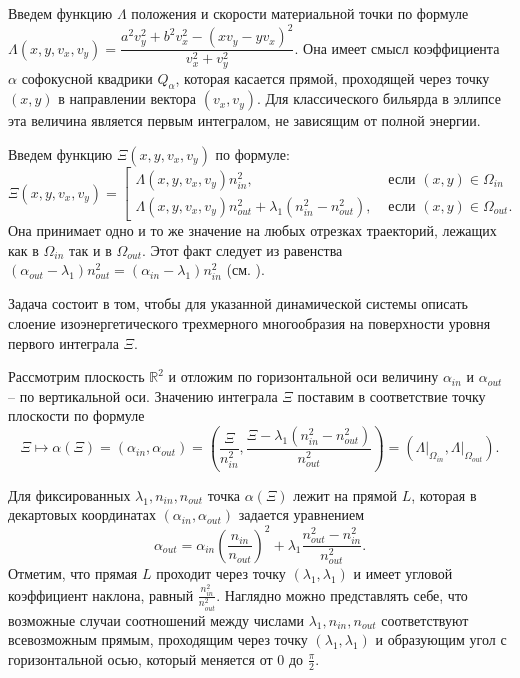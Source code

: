 Введем функцию $\Lambda$ положения и скорости материальной точки по формуле 
$\Lambda(x, y, v_x, v_y) =  \dfrac{a^2 v_y^2 + b^2v_x^2 - (x v_y-y v_x)^2}{v_x^2 + v_y^2}$. 
Она имеет смысл коэффициента $\alpha$  софокусной квадрики $Q_\alpha$, которая касается прямой, проходящей через точку $(x,y)$ в направлении вектора $(v_x, v_y)$.
Для классического бильярда в эллипсе эта величина является первым интегралом, не зависящим от полной энергии.

Введем функцию  $\Xi(x, y, v_x, v_y)$ по формуле: 
\begin{equation*}
\Xi(x, y, v_x, v_y) = \left[
\begin{array}{ll}
    \Lambda(x, y, v_x, v_y) n_{in}^2, &  \text{ если } (x,y) \in \Omega_{in} \\
    \Lambda(x, y, v_x, v_y) n_{out}^2 + \lambda_1 (n_{in}^2-n_{out}^2), & \text{ если } (x,y) \in \Omega_{out}    .
\end{array}
\right.
\end{equation*}
Она принимает одно и то же значение на любых отрезках траекторий, лежащих как в $\Omega_{in}$ так и в $\Omega_{out}$. Этот факт следует из равенства $(\alpha_{out} - \lambda_1) n_{out}^2 = (\alpha_{in} - \lambda_1) n_{in}^2$ (см. \cite{vestnikLatest}). 

Задача состоит в том, чтобы для указанной динамической системы описать слоение изоэнергетического трехмерного многообразия  на поверхности уровня первого интеграла $\Xi$.

Рассмотрим плоскость $\mathbb{R}^2$ и отложим по горизонтальной оси величину $\alpha_{in}$ и $\alpha_{out}$ -- по вертикальной оси.
Значению интеграла $\Xi$ поставим в соответствие точку плоскости по формуле
\begin{equation}
\Xi \mapsto \alpha(\Xi) = (\alpha_{in}, \alpha_{out} ) = \left( \frac{\Xi}{n_{in}^2}, \frac{\Xi - \lambda_1 (n_{in}^2 - n_{out}^2)}{n_{out}^2} \right) = \left( \left. \Lambda \right|_{\Omega_{in}}, \left. \Lambda \right|_{\Omega_{out}} \right).
\label{XiToLine}
\end{equation}

Для фиксированных $\lambda_1, n_{in}, n_{out}$ точка $\alpha(\Xi)$ лежит на прямой $L$, которая в декартовых координатах $(\alpha_{in}, \alpha_{out})$ задается уравнением
\begin{equation}
\alpha_{out} = \alpha_{in} \left(\frac{n_{in}}{n_{out}}\right)^2 + \lambda_1 \frac{n_{out}^2 - n_{in}^2}{n_{out}^2}.
\label{eq:L_line}
\end{equation}
Отметим, что прямая $L$ проходит через точку $(\lambda_1, \lambda_1)$ и имеет угловой коэффициент наклона, равный $\frac{n_{in}^2}{n_{out}^2}$. Наглядно можно представлять себе, что возможные случаи соотношений между числами $\lambda_1, n_{in}, n_{out}$ соответствуют всевозможным прямым, проходящим через точку $(\lambda_1, \lambda_1)$ и образующим угол с горизонтальной осью, который меняется от $0$ до  $\frac{\pi}{2}$.

